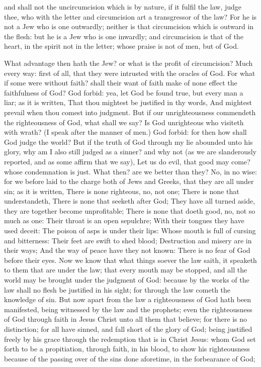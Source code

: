 and shall not the uncircumcision which is by nature, if it fulfil the law, judge thee, who with the letter and circumcision art a transgressor of the law? For he is not a Jew who is one outwardly; neither is that circumcision which is outward in the flesh: but he is a Jew who is one inwardly; and circumcision is that of the heart, in the spirit not in the letter; whose praise is not of men, but of God. 

What advantage then hath the Jew? or what is the profit of circumcision? Much every way: first of all, that they were intrusted with the oracles of God. For what if some were without faith? shall their want of faith make of none effect the faithfulness of God? God forbid: yea, let God be found true, but every man a liar; as it is written, That thou mightest be justified in thy words, And mightest prevail when thou comest into judgment.  But if our unrighteousness commendeth the righteousness of God, what shall we say? Is God unrighteous who visiteth with wrath? (I speak after the manner of men.) God forbid: for then how shall God judge the world? But if the truth of God through my lie abounded unto his glory, why am I also still judged as a sinner? and why not (as we are slanderously reported, and as some affirm that we say), Let us do evil, that good may come? whose condemnation is just.  What then? are we better than they? No, in no wise: for we before laid to the charge both of Jews and Greeks, that they are all under sin; as it is written, There is none righteous, no, not one;  There is none that understandeth, There is none that seeketh after God;  They have all turned aside, they are together become unprofitable; There is none that doeth good, no, not so much as one:  Their throat is an open sepulchre; With their tongues they have used deceit: The poison of asps is under their lips:  Whose mouth is full of cursing and bitterness:  Their feet are swift to shed blood;  Destruction and misery are in their ways;  And the way of peace have they not known:  There is no fear of God before their eyes.  Now we know that what things soever the law saith, it speaketh to them that are under the law; that every mouth may be stopped, and all the world may be brought under the judgment of God: because by the works of the law shall no flesh be justified in his sight; for through the law cometh the knowledge of sin.  But now apart from the law a righteousness of God hath been manifested, being witnessed by the law and the prophets; even the righteousness of God through faith in Jesus Christ unto all them that believe; for there is no distinction; for all have sinned, and fall short of the glory of God; being justified freely by his grace through the redemption that is in Christ Jesus: whom God set forth to be a propitiation, through faith, in his blood, to show his righteousness because of the passing over of the sins done aforetime, in the forbearance of God; 